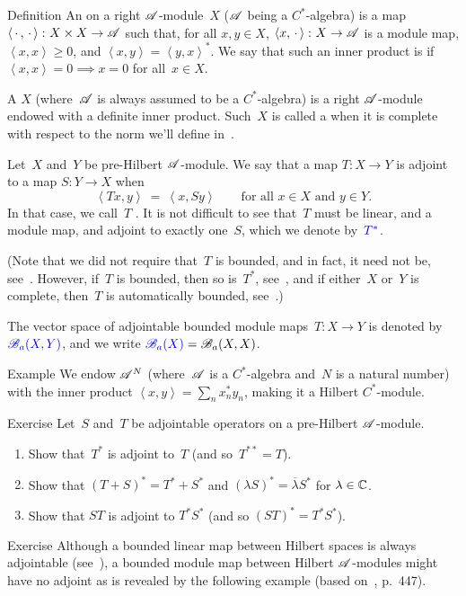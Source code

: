 \documentclass[a]{subfiles}
\begin{document}
\begin{parsec}%
\begin{point}{Definition}%
An  on a right $\mathscr{A}$-module~$X$
($\mathscr{A}$ being a $C^*$-algebra) is a map
$\left<\,\cdot\,,\,\cdot\,\right>\colon X\times X\to\mathscr{A}$
such that, for all $x,y\in X$,
$\left<x,\,\cdot\,\right>\colon X\to \mathscr{A}$
is a module map, $\left<x,x\right>\geq 0$,
and $\left<x,y\right>=\left<y,x\right>^*$.
We say that such an inner product is 
if~$\left<x,x\right>=0\implies x=0$ for all~$x\in X$.

A  $X$
(where~$\mathscr{A}$ is always assumed to be a $C^*$-algebra)
is a right $\mathscr{A}$-module endowed with a definite inner product.
Such~$X$ is called
a 
when it is complete
with respect to
the norm we'll define in~.

Let~$X$ and~$Y$ be pre-Hilbert $\mathscr{A}$-module.
We say that a map $T\colon X\to Y$
is adjoint to a map $S\colon Y\to X$
when
\begin{equation*}
\left<Tx,y\right>\ =\ \left<x,Sy\right>
\qquad \text{for all $x\in X$ and $y\in Y$}.
\end{equation*}
In that case, we call~$T$ .
It is not difficult to see that~$T$
must be linear, and a module map, and 
adjoint to exactly one~$S$, which we denote by~$\Define{T^*}$.

(Note that we did not require that~$T$
is bounded, and in fact, it need not be, 
see~.
However, if~$T$ is bounded, then so is~$T^*$, 
see~,
and if either~$X$ or~$Y$ is complete,
then~$T$ is automatically bounded, see~.)

The vector space of adjointable bounded module maps~$T\colon X\to Y$ 
is denoted
by~$\Define{\scrB_a(X,Y)}$,
and we write $\Define{\scrB_a(X)}=\scrB_a(X,X)$.
\end{point}
\begin{point}{Example}%
We endow $\mathscr{A}^N$
(where~$\mathscr{A}$ is a $C^*$-algebra and~$N$ is a natural number)
with the inner product $\left<x,y\right>=\sum_n x_n^*y_n$,
making it a Hilbert $C^*$-module.
\end{point}
\begin{point}{Exercise}%
Let~$S$ and~$T$ be adjointable operators on a 
pre-Hilbert $\mathscr{A}$-module.
\begin{enumerate}
\item
	Show that~$T^*$ is adjoint to~$T$ (and so~$T^{**}=T$).
\item
Show that $(T+S)^*=T^*+S^*$ 
and $(\lambda S)^*=\overline{\lambda}S^*$ for $\lambda\in \mathbb{C}$.
\item
Show that $ST$ is adjoint to $T^*S^*$
(and so $(ST)^*=T^*S^*$).
\end{enumerate}
\end{point}
\begin{point}{Exercise}%
Although a bounded linear map between Hilbert spaces
is always adjointable (see~),
a bounded module map
between Hilbert $\mathscr{A}$-modules
might have no adjoint
as is revealed by the following example
(based on~\cite{paschke}, p.~447).


\end{point}
\end{parsec}
\end{document}
